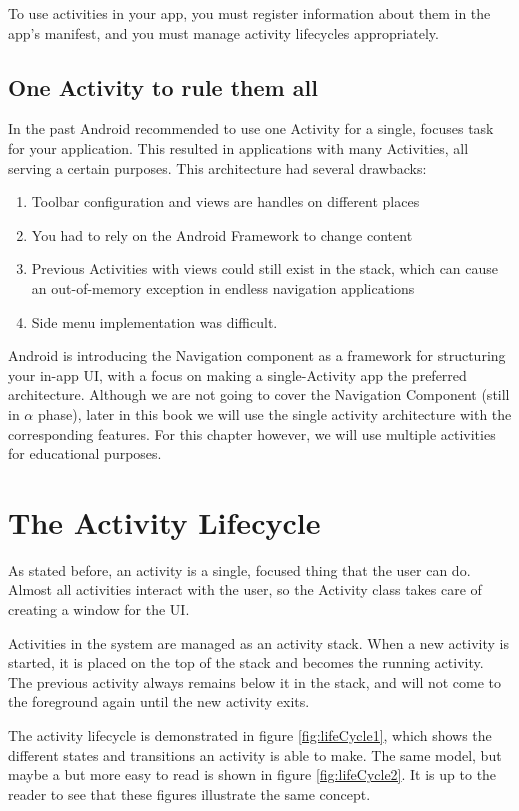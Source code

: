 To use activities in your app, you must register information about them in the app’s manifest, and you must manage activity lifecycles appropriately.

\subsection{One Activity to rule them all}
In the past Android recommended to use one Activity for a single, focuses task for your application.
This resulted in applications with many Activities, all serving a certain purposes.
This architecture had several drawbacks:

\begin{enumerate}
	\item Toolbar configuration and views are handles on different places
	\item You had to rely on the Android Framework to change content
	\item Previous Activities with views could still exist in the stack, which can cause an out-of-memory exception in endless navigation applications
	\item Side menu implementation was difficult.
\end{enumerate}

Android is introducing the Navigation component as a framework for structuring your in-app UI, with a focus on making a single-Activity app the preferred architecture.
Although we are not going to cover the Navigation Component (still in $\alpha$ phase), later in this book we will use the single activity architecture with the corresponding features.
For this chapter however, we will use multiple activities for educational purposes.

\section{The Activity Lifecycle}
As stated before, an activity is a single, focused thing that the user can do.
Almost all activities interact with the user, so the Activity class takes care of creating a window for the UI.

Activities in the system are managed as an activity stack.
When a new activity is started, it is placed on the top of the stack and becomes the running activity.
The previous activity always remains below it in the stack, and will not come to the foreground again until the new activity exits.

The activity lifecycle is demonstrated in figure \ref{fig:lifeCycle1}, which shows the different states and transitions an activity is able to make.
The same model, but maybe a but more easy to read is shown in figure \ref{fig:lifeCycle2}.
It is up to the reader to see that these figures illustrate the same concept.

